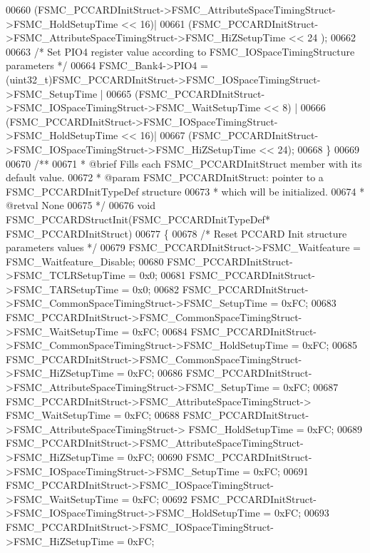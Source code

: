 \begin{DoxyCode}
00660                       (FSMC\_PCCARDInitStruct->FSMC\_AttributeSpaceTimingStruct->FSMC\_HoldSetupTime << 
      16)|
00661                       (FSMC\_PCCARDInitStruct->FSMC\_AttributeSpaceTimingStruct->FSMC\_HiZSetupTime << 24
      );
00662 
00663   \textcolor{comment}{/* Set PIO4 register value according to FSMC\_IOSpaceTimingStructure parameters */}
00664   FSMC_Bank4->PIO4 = (uint32\_t)FSMC\_PCCARDInitStruct->FSMC\_IOSpaceTimingStruct->FSMC\_SetupTime |
00665                      (FSMC\_PCCARDInitStruct->FSMC\_IOSpaceTimingStruct->FSMC\_WaitSetupTime << 8) |
00666                      (FSMC\_PCCARDInitStruct->FSMC\_IOSpaceTimingStruct->FSMC\_HoldSetupTime << 16)|
00667                      (FSMC\_PCCARDInitStruct->FSMC\_IOSpaceTimingStruct->FSMC\_HiZSetupTime << 24);
00668 \}
00669 
00670 \textcolor{comment}{/**}
00671 \textcolor{comment}{  * @brief  Fills each FSMC\_PCCARDInitStruct member with its default value.}
00672 \textcolor{comment}{  * @param  FSMC\_PCCARDInitStruct: pointer to a FSMC\_PCCARDInitTypeDef structure}
00673 \textcolor{comment}{  *         which will be initialized.}
00674 \textcolor{comment}{  * @retval None}
00675 \textcolor{comment}{  */}
00676 \textcolor{keywordtype}{void} FSMC_PCCARDStructInit(FSMC\_PCCARDInitTypeDef* FSMC\_PCCARDInitStruct)
00677 \{
00678   \textcolor{comment}{/* Reset PCCARD Init structure parameters values */}
00679   FSMC\_PCCARDInitStruct->FSMC_Waitfeature = FSMC_Waitfeature_Disable;
00680   FSMC\_PCCARDInitStruct->FSMC_TCLRSetupTime = 0x0;
00681   FSMC\_PCCARDInitStruct->FSMC_TARSetupTime = 0x0;
00682   FSMC\_PCCARDInitStruct->FSMC_CommonSpaceTimingStruct->FSMC_SetupTime = 0xFC;
00683   FSMC\_PCCARDInitStruct->FSMC_CommonSpaceTimingStruct->FSMC_WaitSetupTime = 0xFC;
00684   FSMC\_PCCARDInitStruct->FSMC_CommonSpaceTimingStruct->FSMC_HoldSetupTime = 0xFC;
00685   FSMC\_PCCARDInitStruct->FSMC_CommonSpaceTimingStruct->FSMC_HiZSetupTime = 0xFC;
00686   FSMC\_PCCARDInitStruct->FSMC_AttributeSpaceTimingStruct->FSMC_SetupTime = 0xFC;
00687   FSMC\_PCCARDInitStruct->FSMC_AttributeSpaceTimingStruct->
      FSMC_WaitSetupTime = 0xFC;
00688   FSMC\_PCCARDInitStruct->FSMC_AttributeSpaceTimingStruct->
      FSMC_HoldSetupTime = 0xFC;
00689   FSMC\_PCCARDInitStruct->FSMC_AttributeSpaceTimingStruct->FSMC_HiZSetupTime = 0xFC;
00690   FSMC\_PCCARDInitStruct->FSMC_IOSpaceTimingStruct->FSMC_SetupTime = 0xFC;
00691   FSMC\_PCCARDInitStruct->FSMC_IOSpaceTimingStruct->FSMC_WaitSetupTime = 0xFC;
00692   FSMC\_PCCARDInitStruct->FSMC_IOSpaceTimingStruct->FSMC_HoldSetupTime = 0xFC;
00693   FSMC\_PCCARDInitStruct->FSMC_IOSpaceTimingStruct->FSMC_HiZSetupTime = 0xFC;

\end{DoxyCode}
